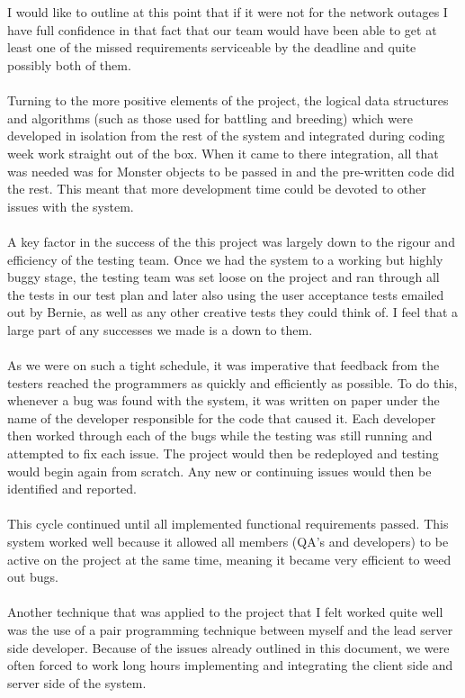 \documentclass{project}
\begin{document}
\\\\
I would like to outline at this point that if it were not for the network outages I have full confidence in that fact that our team would have been able to get at least one of the missed requirements serviceable by the deadline and quite possibly both of them.
\\\\
Turning to the more positive elements of the project, the logical data structures and algorithms (such as those used for battling and breeding) which were developed in isolation from the rest of the system and integrated during coding week work straight out of the box. When it came to there integration, all that was needed was for Monster objects to be passed in and the pre-written code did the rest. This meant that more development time could be devoted to other issues with the system.
\\\\
A key factor in the success of the this project was largely down to the rigour and efficiency of the testing team. Once we had the system to a working but highly buggy stage, the testing team was set loose on the project and ran through all the tests in our test plan and later also using the user acceptance tests emailed out by Bernie, as well as any other creative tests they could think of. I feel that a large part of any successes we made is a down to them.
\\\\
As we were on such a tight schedule, it was imperative that feedback from the testers reached the programmers as quickly and efficiently as possible. To do this, whenever a bug was found with the system, it was written on paper under the name of the developer responsible for the code that caused it. Each developer then worked through each of the bugs while the testing was still running and attempted to fix each issue. The project would then be redeployed and testing would begin again from scratch. Any new or continuing issues would then be identified and reported. 
\\\\
This cycle continued until all implemented functional requirements passed. This system worked well because it allowed all members (QA's and developers) to be active on the project at the same time, meaning it became very efficient to weed out bugs.
\\\\
Another technique that was applied to the project that I felt worked quite well was the use of a pair programming technique between myself and the lead server side developer. Because of the issues already outlined in this document, we were often forced to work long hours implementing and integrating the client side and server side of the system. 
\end{document}
